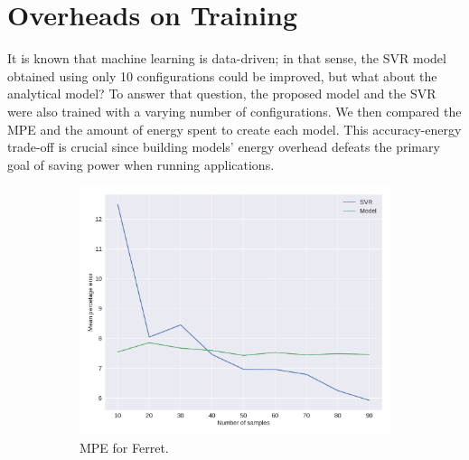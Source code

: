 \section{Overheads on Training} \label{subsec:overhead_on_training}
It is known that machine learning is data-driven; in that sense, the SVR model obtained using only 10 configurations could be improved, but what about the analytical model? 
To answer that question, the proposed model and the SVR were also trained with a varying number of configurations.
We then compared the MPE and the amount of energy spent to create each model. 
This accuracy-energy trade-off is crucial since building models' energy overhead defeats the primary goal of saving power when running applications.
\enlargethispage{.5cm}

\begin{figure}[H]
	\centering
	\captionsetup[subfigure]{justification=centering}
	\begin{subfigure}[b]{0.45\textwidth}
		\centerline{\includegraphics[width=\columnwidth]{models/figures/overhead/completo_ferret_4.pdf}}
		\caption{MPE for Ferret.}
		\label{fig:overhead_ferret}
	\end{subfigure}
	\begin{subfigure}[b]{0.45\textwidth}

\end{subfigure}
\end{figure}
